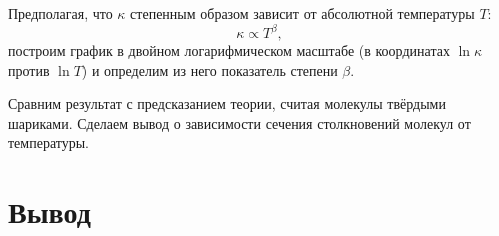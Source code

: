 \documentclass[a4paper,12pt]{article} %
\begin{document}
\begin{enumerate}
    Предполагая, что $\kappa$ степенным образом зависит от абсолютной температуры $T$: 
    \[
    \kappa \propto T^\beta,
    \]
    построим график в двойном логарифмическом масштабе (в координатах $\ln \kappa$ против $\ln T$) и определим из него показатель степени $\beta$. 

    Сравним результат с предсказанием теории, считая молекулы твёрдыми шариками. Сделаем вывод о зависимости сечения столкновений молекул от температуры.
\end{enumerate}

\section*{Вывод}
\end{document}
